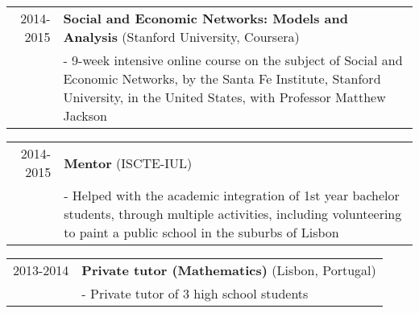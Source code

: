 \documentclass[a4paper,11pt]{article} %
\begin{document}
\begin{tabular}{r|p{13cm}}
	2014-2015 & \textbf{Social and Economic Networks: Models and Analysis} (Stanford University, Coursera) \\
	& - 9-week intensive online course on the subject of Social and Economic Networks, by the Santa Fe Institute, Stanford University, in the United States, with Professor Matthew Jackson \\
\end{tabular}

\begin{tabular}{r|p{13cm}}
	2014-2015 & \textbf{Mentor} (ISCTE-IUL) \\
	& - Helped with the academic integration of 1st year bachelor students, through multiple activities, including volunteering to paint a public school in the suburbs of Lisbon \\
\end{tabular}

\begin{tabular}{r|p{13cm}}
	2013-2014 & \textbf{Private tutor (Mathematics)} (Lisbon, Portugal) \\
	& - Private tutor of 3 high school students \\
\end{tabular}
\end{document}
